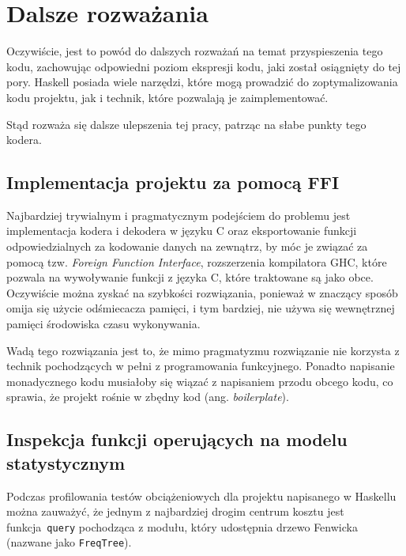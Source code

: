 \documentclass[../../thesis.tex]{subfiles}
\begin{document}
\section{Dalsze rozważania}

Oczywiście, jest to powód do dalszych rozważań na temat przyspieszenia
tego kodu, zachowując odpowiedni poziom ekspresji kodu, jaki został
osiągnięty do tej pory. Haskell posiada wiele narzędzi, które mogą
prowadzić do zoptymalizowania kodu projektu, jak i technik, które
pozwalają je zaimplementować.

Stąd rozważa się dalsze ulepszenia tej pracy, patrząc na słabe punkty tego kodera.

\subsection{Implementacja projektu za pomocą FFI}

Najbardziej trywialnym i pragmatycznym podejściem do problemu jest
implementacja kodera i dekodera w języku C oraz eksportowanie funkcji
odpowiedzialnych za kodowanie danych na zewnątrz, by móc je związać
za pomocą tzw. \emph{Foreign Function Interface}, rozszerzenia kompilatora
GHC, które pozwala na wywoływanie funkcji z języka C, które traktowane 
są jako obce. Oczywiście można zyskać na szybkości rozwiązania,
ponieważ w znaczący sposób omija się użycie odśmiecacza pamięci,
i tym bardziej, nie używa się wewnętrznej pamięci środowiska
czasu wykonywania.

Wadą tego rozwiązania jest to, że mimo pragmatyzmu rozwiązanie nie korzysta
z technik pochodzących w pełni z programowania funkcyjnego.
Ponadto napisanie monadycznego kodu musiałoby się wiązać
z napisaniem przodu obcego kodu, co sprawia, że projekt
rośnie w zbędny kod (ang. \emph{boilerplate}).

\subsection{Inspekcja funkcji operujących na modelu statystycznym}

Podczas profilowania testów obciążeniowych dla projektu napisanego w Haskellu
można zauważyć, że jednym z najbardziej drogim centrum kosztu jest
funkcja~\texttt{query} pochodząca z modułu, który udostępnia
drzewo Fenwicka (nazwane jako \texttt{FreqTree}). 
\end{document}
